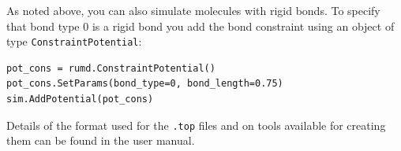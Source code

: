 As noted above, you can also simulate molecules with rigid bonds. To 
specify that bond type 0 is a rigid bond you add the bond constraint
using an object of type \verb|ConstraintPotential|:
\begin{verbatim}
pot_cons = rumd.ConstraintPotential()
pot_cons.SetParams(bond_type=0, bond_length=0.75)
sim.AddPotential(pot_cons)
\end{verbatim}

\setlength{\parindent}{\saveparindent}

Details of the format used for the \verb|.top| files and on tools available for
creating them can be found in the user manual.


\clearpage
%
